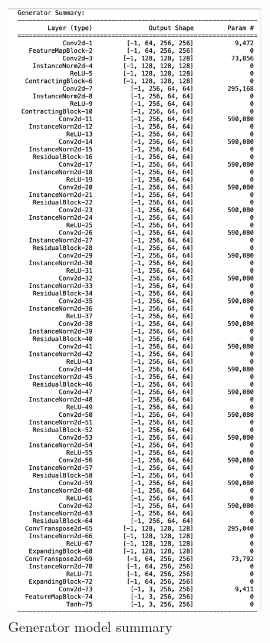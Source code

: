 \documentclass[UKenglish,12pt]{master-style}
\begin{document}
\begin{figure}[htbp]
    \centering
    \includegraphics[width=0.6\textwidth]{Images/G_model_summary.png}
    \caption{Generator model summary}
    \label{fig:G_model_summary}
\end{figure}
\end{document}
